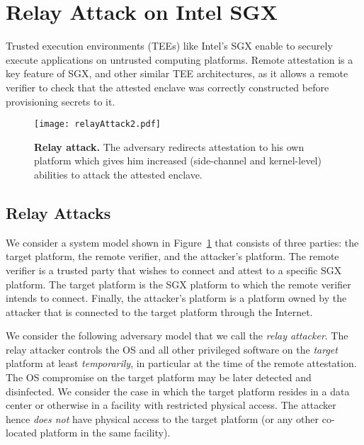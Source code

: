 \section{Relay Attack on Intel SGX}

Trusted execution environments (TEEs) like Intel's SGX enable to securely execute applications on untrusted computing platforms. Remote attestation is a key feature of SGX, and other similar TEE architectures, as it allows a remote verifier to check that the attested enclave was correctly constructed before provisioning secrets to it. 

\begin{figure}[t]
 \centering
  \texttt{[image: relayAttack2.pdf]}
 \caption{\textbf{Relay attack.} The adversary redirects attestation to his own platform which gives him increased (side-channel and kernel-level) abilities to attack the attested enclave.}
 \label{fig:SystemModel}
\end{figure}

\subsection{Relay Attacks}

We consider a system model shown in Figure~\ref{fig:SystemModel} that consists of three parties: the target platform, the remote verifier, and the attacker's platform. The remote verifier is a trusted party that wishes to connect and attest to a specific SGX platform. The target platform is the SGX platform to which the remote verifier intends to connect. Finally, the attacker's platform is a platform owned by the attacker that is connected to the target platform through the Internet.

 We consider the following adversary model that we call the \emph{relay attacker}. The relay attacker controls the OS and all other privileged software on the \emph{target} platform at least \emph{temporarily}, in particular at the time of the remote attestation. The OS compromise on the target platform may be later detected and disinfected. We consider the case in which the target platform resides in a data center or otherwise in a facility with restricted physical access. The attacker hence \emph{does not} have physical access to the target platform (or any other co-located platform in the same facility).

